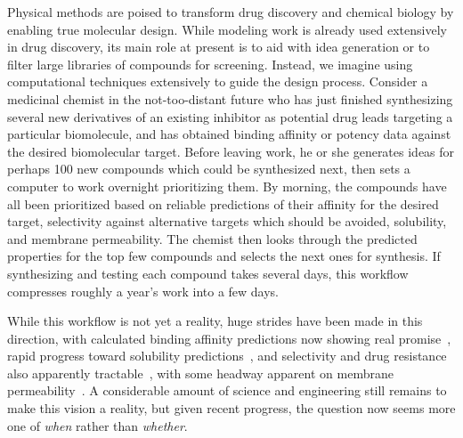 \documentclass[11pt]{article}
\begin{document}
Physical methods are poised to transform drug discovery and chemical biology by enabling true molecular design. 
While modeling work is already used extensively in drug discovery, its main role at present is to aid with idea generation or to filter large libraries of compounds for screening. 
Instead, we imagine using computational techniques extensively to guide the design process. 
Consider a medicinal chemist in the not-too-distant future who has just finished synthesizing several new derivatives of an existing inhibitor as potential drug leads targeting a particular biomolecule, and has obtained binding affinity or potency data against the desired biomolecular target. 
Before leaving work, he or she generates ideas for perhaps 100 new compounds which could be synthesized next, then sets a computer to work overnight prioritizing them. 
By morning, the compounds have all been prioritized based on reliable predictions of their affinity for the desired target, selectivity against alternative targets which should be avoided, solubility, and membrane permeability.  
The chemist then looks through the predicted properties for the top few compounds and selects the next ones for synthesis. 
If synthesizing and testing each compound takes several days, this workflow compresses roughly a year's work into a few days.

While this workflow is not yet a reality, huge strides have been made in this direction, with calculated binding affinity predictions now showing real promise~\cite{mobley_perspective_2012, christ_accuracy_2014, deng_distinguishing_2015, sherborne_preprint_2016, schrodinger_accurate_2015, christ_binding_2016, cui_affinity_2016, verras_free_2016}, rapid progress toward solubility predictions~\cite{schnieders_structure_2012, park_absolute_2014, liu_using_2016}, and selectivity and drug resistance also apparently tractable~\cite{leonis_contribution_2013}, with some headway apparent on membrane permeability~\cite{lee_permeability_2016, comer_permeability_2014}. 
A considerable amount of science and engineering still remains to make this vision a reality, but given recent progress, the question now seems more one of \emph{when} rather than \emph{whether}. 
\end{document}
